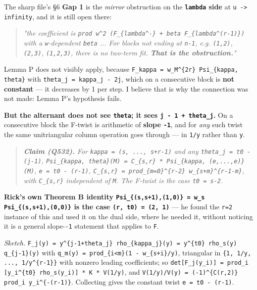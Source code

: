 \documentclass[11pt,a4paper]{article}
\begin{document}
The sharp file's \S{}6 \textbf{Gap 1} is the \emph{mirror} obstruction on the \textbf{\mbox{\texttt{lambda}} side} at \mbox{\texttt{u -> infinity}}, and it is still open there:

\begin{quote}\itshape "the coefficient is \mbox{\texttt{prod w\textasciicircum{}2 (F\_\{lambda\textasciicircum{}-\} + beta F\_\{lambda\textasciicircum{}(r-1)\})}} with a \mbox{\texttt{w}}-dependent \mbox{\texttt{beta}} ... For blocks not ending at \mbox{\texttt{n-1}}, e.g. \mbox{\texttt{(1,2)}}, \mbox{\texttt{(2,3)}}, \mbox{\texttt{(1,2,3)}}, there is no two-term fit. \textbf{That is the obstruction.}"\end{quote}

Lemma P does not visibly apply, because \mbox{\texttt{F\_kappa = w\_M\textasciicircum{}\{2r\} Psi\_\{kappa, theta\}}} with \mbox{\texttt{theta\_j = kappa\_j - 2j}}, which on a consecutive block is \textbf{not constant} --- it decreases by 1 per step. I believe that is why the connection was not made: Lemma P's hypothesis fails.

\textbf{But the alternant does not see \mbox{\texttt{theta}}; it sees \mbox{\texttt{j - 1 + theta\_j}}.} On a consecutive block the F-twist is arithmetic of \textbf{slope \mbox{\texttt{-1}}}, and for \emph{any} such twist the same unitriangular column operation goes through --- in \mbox{\texttt{1/y}} rather than \mbox{\texttt{y}}.

\begin{quote}\itshape \textbf{Claim (Q532).} For \mbox{\texttt{kappa = (s, ..., s+r-1)}} and any \mbox{\texttt{theta\_j = t0 - (j-1)}},  \mbox{\texttt{Psi\_\{kappa, theta\}(M) = C\_\{s,r\} * Psi\_\{kappa, (e,...,e)\}(M)}}, \mbox{\texttt{e = t0 - (r-1)}}, \mbox{\texttt{C\_\{s,r\} = prod\_\{m=0\}\textasciicircum{}\{r-2\} w\_\{s+m\}\textasciicircum{}\{r-1-m\}}},  with \mbox{\texttt{C\_\{s,r\}}} independent of \mbox{\texttt{M}}. The F-twist is the case \mbox{\texttt{t0 = s-2}}.\end{quote}

\textbf{Rick's own Theorem B identity \mbox{\texttt{Psi\_\{(s,s+1),(1,0)\} = w\_s Psi\_\{(s,s+1),(0,0)\}}} is the case \mbox{\texttt{(r, t0) = (2, 1)}}} --- he found the \mbox{\texttt{r=2}} instance of this and used it on the dual side, where he needed it, without noticing it is a general slope-\mbox{\texttt{-1}} statement that applies to \mbox{\texttt{F}}.

\emph{Sketch.} \mbox{\texttt{F\_j(y) = y\textasciicircum{}\{j-1+theta\_j\} rho\_\{kappa\_j\}(y) = y\textasciicircum{}\{t0\} rho\_s(y) q\_\{j-1\}(y)}} with \mbox{\texttt{q\_m(y) = prod\_\{i<m\}(1 - w\_\{s+i\}/y)}}, triangular in \mbox{\texttt{\{1, 1/y, ..., 1/y\textasciicircum{}\{r-1\}\}}} with nonzero leading coefficients; so \mbox{\texttt{det[F\_j(y\_i)] = prod\_i [y\_i\textasciicircum{}\{t0\} rho\_s(y\_i)] * K * V(1/y)}}, and \mbox{\texttt{V(1/y)/V(y) = (-1)\textasciicircum{}\{C(r,2)\} prod\_i y\_i\textasciicircum{}\{-(r-1)\}}}. Collecting gives the constant twist \mbox{\texttt{e = t0 - (r-1)}}.
\end{document}
